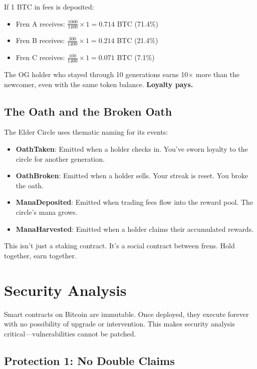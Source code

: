 \documentclass[11pt,a4paper]{article}
\begin{document}
If 1 BTC in fees is deposited:
\begin{itemize}
    \item Fren A receives: $\frac{1000}{1400} \times 1 = 0.714$ BTC (71.4\%)
    \item Fren B receives: $\frac{300}{1400} \times 1 = 0.214$ BTC (21.4\%)
    \item Fren C receives: $\frac{100}{1400} \times 1 = 0.071$ BTC (7.1\%)
\end{itemize}

The OG holder who stayed through 10 generations earns 10$\times$ more than the newcomer, even with the same token balance. \textbf{Loyalty pays.}

\subsection{The Oath and the Broken Oath}

The Elder Circle uses thematic naming for its events:

\begin{itemize}
    \item \textbf{OathTaken}: Emitted when a holder checks in. You've sworn loyalty to the circle for another generation.
    \item \textbf{OathBroken}: Emitted when a holder sells. Your streak is reset. You broke the oath.
    \item \textbf{ManaDeposited}: Emitted when trading fees flow into the reward pool. The circle's mana grows.
    \item \textbf{ManaHarvested}: Emitted when a holder claims their accumulated rewards.
\end{itemize}

This isn't just a staking contract. It's a social contract between frens. Hold together, earn together.

\section{Security Analysis}

Smart contracts on Bitcoin are immutable. Once deployed, they execute forever with no possibility of upgrade or intervention. This makes security analysis critical---vulnerabilities cannot be patched.

\subsection{Protection 1: No Double Claims}
\end{document}
